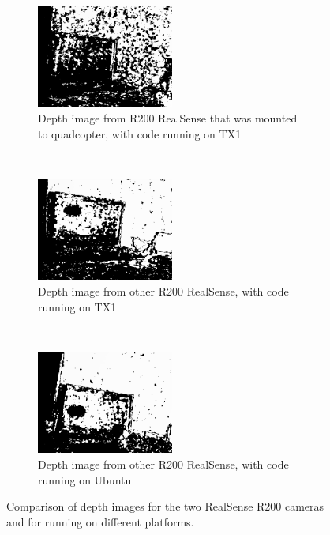 \documentclass[12pt,a4paper]{article}
\begin{document}
    \begin{figure}[h]
      \centering
      \begin{subfigure}[t]{0.3\textwidth}
      \centering
        \includegraphics[width=45mm]{camera_tests/quad_camera_TX1}
      \caption{Depth image from R200 RealSense that was mounted to quadcopter, with code running on TX1}
      \end{subfigure} %
      ~
      \begin{subfigure}[t]{0.3\textwidth}
      \centering
        \includegraphics[width=45mm]{camera_tests/other_camera_TX1}
      \caption{Depth image from other R200 RealSense, with code running on TX1}
      \end{subfigure}%
      ~
      \begin{subfigure}[t]{0.3\textwidth}
      \centering
        \includegraphics[width=45mm]{camera_tests/other_camera_ubuntu}
      \caption{Depth image from other R200 RealSense, with code running on Ubuntu}
      \end{subfigure}
      \caption{Comparison of depth images for the two RealSense R200 cameras and for running on different platforms.}
      \label{f: R200 bad depth}
    \end{figure}


\end{document}
